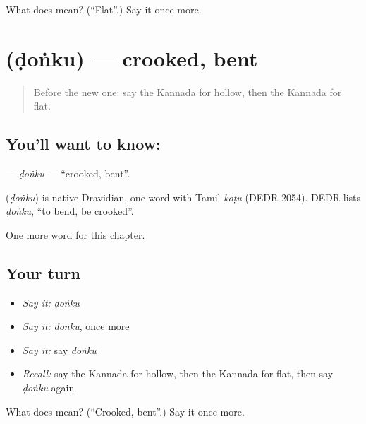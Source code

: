 \begin{tcolorbox}[breakable,colback=teal!4,colframe=teal!35!black,title={Before you move on}]
What does  mean? (\textquotedblleft{}Flat\textquotedblright{}.) Say it once more.
\end{tcolorbox}
\section[\texorpdfstring{\kn{ಡೊಂಕು} (ḍoṅku)}{ಡೊಂಕು (ḍoṅku)}]{ (ḍoṅku) — crooked, bent}

\label{lesson:KA-C256-donku}



\begin{quote}
Before the new one: say the Kannada for hollow, then the Kannada for flat.
\end{quote}

\subsection*{You'll want to know: }
\textbf{} — \emph{ḍoṅku} — \textquotedblleft{}crooked, bent\textquotedblright{}.

\begin{cousinweb}
\textbf{} (\emph{ḍoṅku}) is native Dravidian, one word with Tamil \emph{koṭu} (DEDR 2054). DEDR lists \emph{ḍoṅku}, \textquotedblleft{}to bend, be crooked\textquotedblright{}.
\end{cousinweb}

\begin{grammarlens}[title={What you've built}]
One more word for this chapter.
\end{grammarlens}

\subsection*{Your turn}
\begin{itemize}
\raggedright
  \item \emph{Say it:} \emph{ḍoṅku}
  \item \emph{Say it:} \emph{ḍoṅku}, once more
  \item \emph{Say it:} say \emph{ḍoṅku}
  \item \emph{Recall:} say the Kannada for hollow, then the Kannada for flat, then say \emph{ḍoṅku} again
\end{itemize}

\begin{tcolorbox}[breakable,colback=teal!4,colframe=teal!35!black,title={Before you move on}]
What does  mean? (\textquotedblleft{}Crooked, bent\textquotedblright{}.) Say it once more.
\end{tcolorbox}

